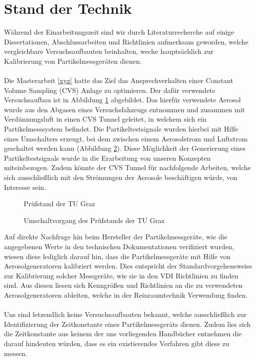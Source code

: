 \section{Stand der Technik}
W\"{a}hrend der Einarbeitungszeit sind wir durch Literaturrecherche auf einige Dissertationen, Abschlussarbeiten und Richtlinien aufmerksam geworden, welche vergleichbare Versuchsaufbauten beinhalten, weche haupts\"{a}chlich zur Kalibrierung von Partikelmessger\"{a}ten dienen.
\\\\
Die Masterarbeit \ref{xyz} hatte das Ziel das Ansprechverhalten einer Constant Volume Sampling (CVS) Anlage zu optimieren. Der daf\"{u}r verwendete Versuchsaufbau ist in Abbildung \ref{aufbau_graz} abgebildet. Das hierf\"{u}r verwendete Aerosol wurde aus den Abgasen eines Versuchsfahzeugs entnommen und zusammen mit Verd\"{u}nnungsluft in einen CVS Tunnel geleitet, in welchem sich ein Partikelmesssystem befindet. Die Partikeltestsignale wurden hierbei mit Hilfe eines Umschalters erzeugt, bei dem zwischen einem Aerosolstrom und Luftstrom geschaltet werden kann (Abbildung \ref{umschalter_graz}). Diese M\"{o}glichkeit der Generierung eines Partikeltestsignals wurde in die Erarbeitung von unseren Konzepten miteinbezogen. Zudem k\"{o}nnte der CVS Tunnel f\"{u}r nachfolgende Arbeiten, welche sich ausschlie{\ss}lich mit den Str\"{o}mungen der Aerosole besch\"{a}ftigen w\"{u}rde, von Interesse sein.
\\
\begin{figure}
	\centering
	\caption{Pr\"{u}fstand der TU Graz}
	\label{aufbau_graz}
\end{figure}

\begin{figure}
	\centering
	\caption{Umschaltvorgang des Pr\"{u}fstands der TU Graz}
	\label{umschalter_graz}
\end{figure}
Auf direkte Nachfrage hin beim Hersteller der Partikelmessger\"{a}te, wie die angegebenen Werte in den technischen Dokumentationen verifiziert wurden, wiesen diese lediglich darauf hin, dass die Partikelmessger\"{a}te mit Hilfe von Aerosolgeneratoren kalibriert werden. Dies entspricht der Standardvorgehensweise zur Kalibrierung solcher Messger\"{a}te, wie sie in den VDI Richtlinien zu finden sind. Aus diesen liesen sich Kenngr\"{o}{\ss}en und Richtlinien an die zu verwendeten Aerosolgeneratoren ableiten, welche in der Reinraumtechnik Verwendung finden.
\\\\
Uns sind letzendlich keine Versuchsaufbauten bekannt, welche ausschlie{\ss}lich zur Identifizierung der Zeitkonstante eines Partikelmessger\"{a}ts dienen. Zudem lies sich die Zeitkonstante aus keinem der uns vorliegenden Handb\"{u}cher entnehmen die darauf hindeuten w\"{u}rden, dass es ein existierendes Verfahren gibt diese zu messen. 